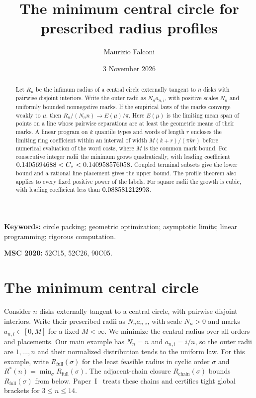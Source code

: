 \documentclass[11pt,letterpaper]{article}
\title{The minimum central circle for prescribed radius profiles}
\author{Maurizio Falconi}
\date{3 November 2026}
\theoremstyle{definition}\newtheorem{definition}[theorem]{Definition}
\theoremstyle{remark}\newtheorem{remark}[theorem]{Remark}
\newcommand{\Rstar}{R^\ast}
\newcommand{\ch}{R_{\mathrm{chain}}}
\newcommand{\full}{R_{\mathrm{full}}}
\newcommand{\CC}{C_\ast}
\begin{document}
\maketitle
\nolinenumbers
\begin{abstract}
Let $R_n$ be the infimum radius of a central circle externally tangent
to $n$ disks with pairwise disjoint interiors. Write the outer radii as
$N_n a_{n,i}$, with positive scales $N_n$ and uniformly bounded
nonnegative marks. If the empirical laws of the marks converge weakly
to $\mu$, then $R_n/(N_n n)\to E(\mu)/\pi$. Here $E(\mu)$ is the limiting
mean span of points on a line whose pairwise separations are at least the
geometric means of their marks. A linear program on $k$ quantile types
and words of length $r$ encloses the limiting ring coefficient within an
interval of width $M(k+r)/(\pi kr)$ before numerical evaluation of the
word costs, where $M$ is the common mark bound.
For consecutive integer radii the minimum grows quadratically, with leading
coefficient $\CstarLower<\CC<\CstarUpper$. Coupled terminal subsets give
the lower bound and a rational line placement gives the upper bound. The
profile theorem also applies to every fixed positive power of the labels.
For square radii the growth is cubic, with leading coefficient less than
$0.088581212993$.
\end{abstract}
\noindent\textbf{Keywords:} circle packing; geometric optimization; asymptotic
limits; linear programming; rigorous computation.
\par\noindent\textbf{MSC 2020:} 52C15, 52C26, 90C05.


\section{The minimum central circle}

Consider $n$ disks externally tangent to a central circle, with pairwise
disjoint interiors. Write their prescribed radii as $N_n a_{n,i}$, with
scale $N_n>0$ and marks $a_{n,i}\in[0,M]$ for a fixed $M<\infty$.
We minimize the central radius over all orders and placements. Our main
example has $N_n=n$ and $a_{n,i}=i/n$, so the outer radii are
$1,\ldots,n$ and their normalized distribution tends to the uniform law.
For this example, write $\full(\sigma)$ for the least feasible radius
in cyclic order $\sigma$ and $\Rstar(n)=\min_\sigma\full(\sigma)$.
The adjacent-chain closure $\ch(\sigma)$ bounds $\full(\sigma)$ from
below. Paper~I~\cite{paperI} treats these chains and certifies tight
global brackets for $3\le n\le14$.
\end{document}
